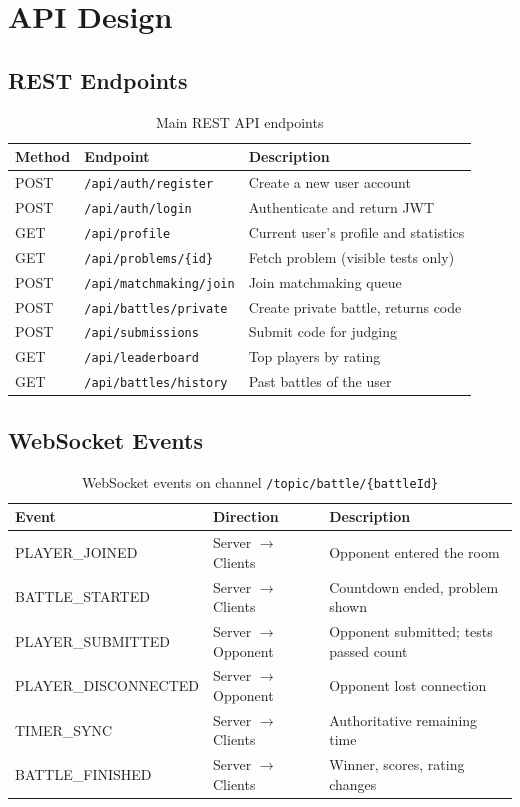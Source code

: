 \documentclass[12pt,a4paper,oneside]{report}
\begin{document}
\section{API Design}
\subsection{REST Endpoints}
\begin{table}[H]
\centering
\small
\begin{tabularx}{\textwidth}{@{}llX@{}}
\toprule
\textbf{Method} & \textbf{Endpoint} & \textbf{Description} \\
\midrule
POST & \texttt{/api/auth/register} & Create a new user account \\
POST & \texttt{/api/auth/login}    & Authenticate and return JWT \\
GET  & \texttt{/api/profile}       & Current user's profile and statistics \\
GET  & \texttt{/api/problems/\{id\}} & Fetch problem (visible tests only) \\
POST & \texttt{/api/matchmaking/join}  & Join matchmaking queue \\
POST & \texttt{/api/battles/private}   & Create private battle, returns code \\
POST & \texttt{/api/submissions}   & Submit code for judging \\
GET  & \texttt{/api/leaderboard}   & Top players by rating \\
GET  & \texttt{/api/battles/history} & Past battles of the user \\
\bottomrule
\end{tabularx}
\caption{Main REST API endpoints}
\end{table}

\subsection{WebSocket Events}
\begin{table}[H]
\centering
\small
\begin{tabularx}{\textwidth}{@{}llX@{}}
\toprule
\textbf{Event} & \textbf{Direction} & \textbf{Description} \\
\midrule
PLAYER\_JOINED       & Server $\to$ Clients & Opponent entered the room \\
BATTLE\_STARTED      & Server $\to$ Clients & Countdown ended, problem shown \\
PLAYER\_SUBMITTED    & Server $\to$ Opponent & Opponent submitted; tests passed count \\
PLAYER\_DISCONNECTED & Server $\to$ Opponent & Opponent lost connection \\
TIMER\_SYNC          & Server $\to$ Clients & Authoritative remaining time \\
BATTLE\_FINISHED     & Server $\to$ Clients & Winner, scores, rating changes \\
\bottomrule
\end{tabularx}
\caption{WebSocket events on channel \texttt{/topic/battle/\{battleId\}}}
\end{table}
\end{document}
